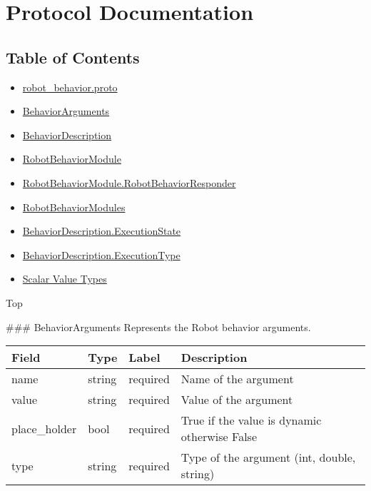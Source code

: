 \section{Protocol Documentation}\label{protocol-documentation}

\subsection{Table of Contents}\label{table-of-contents}

\begin{itemize}
\item
  \hyperref[robotux5fbehavior.proto]{robot\_behavior.proto}
\item
  \hyperref[experimot.msgs.BehaviorArguments]{BehaviorArguments}
\item
  \hyperref[experimot.msgs.BehaviorDescription]{BehaviorDescription}
\item
  \hyperref[experimot.msgs.RobotBehaviorModule]{RobotBehaviorModule}
\item
  \hyperref[experimot.msgs.RobotBehaviorModule.RobotBehaviorResponder]{RobotBehaviorModule.RobotBehaviorResponder}
\item
  \hyperref[experimot.msgs.RobotBehaviorModules]{RobotBehaviorModules}
\item
  \hyperref[experimot.msgs.BehaviorDescription.ExecutionState]{BehaviorDescription.ExecutionState}
\item
  \hyperref[experimot.msgs.BehaviorDescription.ExecutionType]{BehaviorDescription.ExecutionType}
\item
  \hyperref[scalar-value-types]{Scalar Value Types}
\end{itemize}

Top


 \#\#\# BehaviorArguments Represents the Robot behavior arguments.

\begin{longtable}[c]{@{}llll@{}}
\toprule
Field & Type & Label & Description\tabularnewline
\midrule
\endhead
name & string & required & Name of the argument\tabularnewline
value & string & required & Value of the argument\tabularnewline
place\_holder & bool & required & True if the value is dynamic otherwise
False\tabularnewline
type & string & required & Type of the argument (int, double,
string)\tabularnewline
\bottomrule
\end{longtable}

